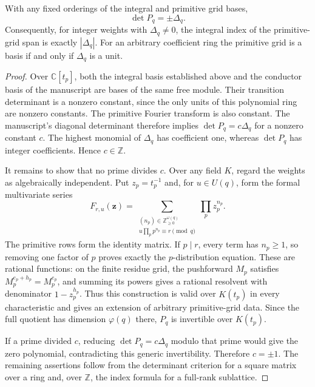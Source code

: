 \begin{theorem}
\label{intdist:thm:determinant}
With any fixed orderings of the integral and primitive grid bases,
\begin{equation}\label{intdist:eq:determinant}
 \det P_q=\pm\Delta_q.
\end{equation}
Consequently, for integer weights with $\Delta_q\ne0$, the integral
index of the primitive-grid span is exactly $|\Delta_q|$. For an
arbitrary coefficient ring the primitive grid is a basis if and only
if $\Delta_q$ is a unit.
\end{theorem}

\begin{proof}
Over $\mathbb C[t_p]$, both the integral basis established above and
the conductor basis of the manuscript are bases of the same free
module. Their transition determinant is a nonzero constant, since the
only units of this polynomial ring are nonzero constants. The
primitive Fourier transform is also constant. The manuscript's
diagonal determinant therefore implies
$\det P_q=c\Delta_q$ for a nonzero constant $c$.
The highest monomial of $\Delta_q$ has coefficient one, whereas
$\det P_q$ has integer coefficients. Hence $c\in\mathbb Z$.

It remains to show that no prime divides $c$. Over any field $K$,
regard the weights as algebraically independent. Put $z_p=t_p^{-1}$
and, for $u\in U(q)$, form the formal multivariate series
\[
 F_{r,u}(\mathbf z)=
 \sum_{\substack{(n_p)\in\mathbb Z_{\ge0}^{\omega(q)}\\
    u\prod_pp^{n_p}\equiv r\pmod q}}
 \prod_pz_p^{n_p}.
\]
The primitive rows form the identity matrix. If $p\mid r$, every term
has $n_p\ge1$, so removing one factor of $p$ proves exactly the
$p$-distribution equation. These are rational functions: on the finite
residue grid, the pushforward $M_p$ satisfies
$M_p^{e_p+h_p}=M_p^{e_p}$, and summing its powers gives a rational
resolvent with denominator $1-z_p^{h_p}$. Thus this construction is
valid over $K(t_p)$ in every characteristic and gives an extension of
arbitrary primitive-grid data. Since the full quotient has dimension
$\varphi(q)$ there, $P_q$ is invertible over $K(t_p)$.

If a prime divided $c$, reducing $\det P_q=c\Delta_q$ modulo that
prime would give the zero polynomial, contradicting this generic
invertibility. Therefore $c=\pm1$. The remaining assertions follow
from the determinant criterion for a square matrix over a ring and,
over $\mathbb Z$, the index formula for a full-rank sublattice.
\end{proof}

